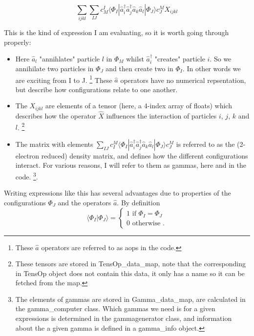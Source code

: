 \documentclass[12pt]{article}
\begin{document}
\begin{equation}
\sum_{ijkl}\sum_{IJ} c_{M}^{I}\langle \Phi_{I} | \hat{a}_{i}^{\dagger}\hat{a}_{j}^{\dagger}\hat{a}_{k}\hat{a}_{l} | \Phi_{J} \rangle c_{J}^{M} X_{ijkl}
\label{eqn:2el_expectation}
\end{equation}

This is the kind of expression I am evaluating, so it is worth going through properly:
\begin{itemize}
\item Here $\hat{a}_{l}$ "annihlates" particle $l$ in $\Phi_{M}$ whilst
$\hat{a}^{\dagger}_{i}$ "creates" particle $i$. So we annihilate two particles in $\Phi_{J}$
and then create two in $\Phi_{I}$. In other words we are exciting from I to J.
\footnote{These $\hat{a}$ operators are referred to as aops in the code.} These $\hat{a}$ operators
have no numerical repsentation,
but describe how configurations relate to one another.
\item The $X_{ijkl}$ are elements of a tensor (here, a 4-index array of floats) which describes how
the operator $\hat{X}$ influences the interaction of particles $i$, $j$, $k$ and $l$.
\footnote{These tensors are stored in TensOp\_data\_map, note that the corresponding in TensOp object
does not contain this data, it only has a name so it can be fetched from the map. }  \\
\item The matrix with elements
$\sum_{IJ} c^{M}_{I}\langle \Phi_{I} | \hat{a}_{i}^{\dagger}\hat{a}_{j}^{\dagger}\hat{a}_{k}\hat{a}_{l} | \Phi_{J} \rangle c_{J}^{M}  $
is referred to as the (2-electron reduced) density matrix, and defines how the different configurations interact. For various reasons,
I will refer to them as gammas, here and in the code. \footnote{The elements of gammas are stored in Gamma\_data\_map, are
calculated in the gamma\_computer class. Which gammas we need is for a given expressions is
determined in the gammagenerator class, and information about the a given gamma is defined in a gamma\_info object.}.\\
\end{itemize}
Writing expressions like this has several advantages due to properties of the configurations
 $\Phi_{J}$ and the operators $\hat{a}$. By definition
\begin{equation}
\langle \Phi_{I} | \Phi_{J} \rangle= 
\begin{cases}
1 \text{\  \ \ \  \ \ \ \ if } \Phi_{I}  = \Phi_{J}\\ 
0 \text{ \ \ otherwise }.
\end{cases}
\label{eqn:overlap}
\end{equation}
\end{document}

